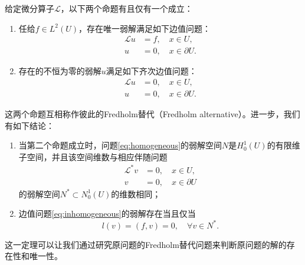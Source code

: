 \documentclass[a4paper,10pt]{ctexart}
\begin{document}
\begin{theorem}
    给定微分算子$ \mathcal{L} $，以下两个命题有且仅有一个成立：
    \begin{enumerate}
        \item 任给$ f\in L^2(U) $，存在唯一弱解满足如下边值问题：
        \begin{equation}\label{eq:inhomogeneous}
            \begin{aligned}
                \mathcal{L}u &= f, \quad x\in U,\\
                u &= 0, \quad x\in \partial U.
            \end{aligned}
        \end{equation}
        \item 存在的不恒为零的弱解$ u $满足如下齐次边值问题：
        \begin{equation}\label{eq:homogeneous}
            \begin{aligned}
                \mathcal{L}u &= 0, \quad x\in U,\\
                u &= 0, \quad x\in \partial U.
            \end{aligned}
        \end{equation}
    \end{enumerate}
    这两个命题互相称作彼此的Fredholm替代（Fredholm alternative）。进一步，我们有如下结论：
    \begin{enumerate}
        \item 当第二个命题成立时，问题\eqref{eq:homogeneous}的弱解空间$ N $是$ H^1_0(U) $的有限维子空间，并且该空间维数与相应伴随问题
        \begin{equation}
            \begin{aligned}
                \mathcal{L}^*v &= 0, \quad x\in U,\\
                v &= 0, \quad x\in \partial U
            \end{aligned}
        \end{equation}
        的弱解空间$ N^*\subset N^1_0(U) $的维数相同；
        \item 边值问题\eqref{eq:inhomogeneous}的弱解存在当且仅当
        \begin{equation}
            l(v) = (f,v) = 0,\quad \forall v\in N^*.
        \end{equation}
    \end{enumerate}
\end{theorem}
\noindent 这一定理可以让我们通过研究原问题的Fredholm替代问题来判断原问题的解的存在性和唯一性。
\end{document}
